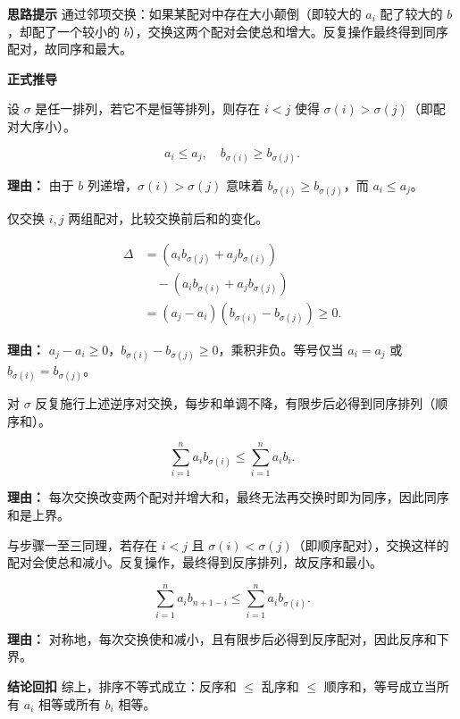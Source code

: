 \begin{proofbox}
	\textbf{\textcolor{CProof}{思路提示}}
	通过邻项交换：如果某配对中存在大小颠倒（即较大的 $a_i$ 配了较大的 $b$，却配了一个较小的 $b$），交换这两个配对会使总和增大。反复操作最终得到同序配对，故同序和最大。

	\medskip
	\textbf{\textcolor{CProof}{正式推导}}
	\begin{description}[style=nextline, leftmargin=2.8em, labelsep=0.5em, itemsep=0.55em]
		\item[\textbf{步骤一（识别逆序）：}]
			设 $\sigma$ 是任一排列，若它不是恒等排列，则存在 $i<j$ 使得 $\sigma(i)>\sigma(j)$（即配对大序小）。\par
			\[
				a_i \leq a_j,\quad b_{\sigma(i)} \geq b_{\sigma(j)} .
			\]
			\par\textbf{理由：} 由于 $b$ 列递增，$\sigma(i)>\sigma(j)$ 意味着 $b_{\sigma(i)} \geq b_{\sigma(j)}$，而 $a_i \leq a_j$。
		\item[\textbf{步骤二（交换增值）：}]
			仅交换 $i,j$ 两组配对，比较交换前后和的变化。\par
			\[
				\begin{aligned}
					\Delta &= (a_i b_{\sigma(j)} + a_j b_{\sigma(i)}) \\ &\quad - (a_i b_{\sigma(i)} + a_j b_{\sigma(j)}) \\ &= (a_j - a_i)(b_{\sigma(i)} - b_{\sigma(j)}) \geq 0 .
			\end{aligned}
			\]
			\par\textbf{理由：} $a_j-a_i\geq 0$，$b_{\sigma(i)}-b_{\sigma(j)}\geq 0$，乘积非负。等号仅当 $a_i=a_j$ 或 $b_{\sigma(i)}=b_{\sigma(j)}$。
		\item[\textbf{步骤三（迭代至同序）：}]
			对 $\sigma$ 反复施行上述逆序对交换，每步和单调不降，有限步后必得到同序排列（顺序和）。\par
			\[
				\sum_{i=1}^{n} a_i b_{\sigma(i)} \leq \sum_{i=1}^{n} a_i b_i .
			\]
			\par\textbf{理由：} 每次交换改变两个配对并增大和，最终无法再交换时即为同序，因此同序和是上界。
		\item[\textbf{步骤四（反序最小）：}]
			与步骤一至三同理，若存在 $i<j$ 且 $\sigma(i)<\sigma(j)$（即顺序配对），交换这样的配对会使总和减小。反复操作，最终得到反序排列，故反序和最小。\par
			\[
				\sum_{i=1}^{n} a_i b_{n+1-i} \leq \sum_{i=1}^{n} a_i b_{\sigma(i)} .
			\]
			\par\textbf{理由：} 对称地，每次交换使和减小，且有限步后必得到反序配对，因此反序和下界。
	\end{description}

	\medskip
	\textbf{\textcolor{CProof}{结论回扣}}
	综上，排序不等式成立：反序和 $\leq$ 乱序和 $\leq$ 顺序和，等号成立当所有 $a_i$ 相等或所有 $b_i$ 相等。
\end{proofbox}
